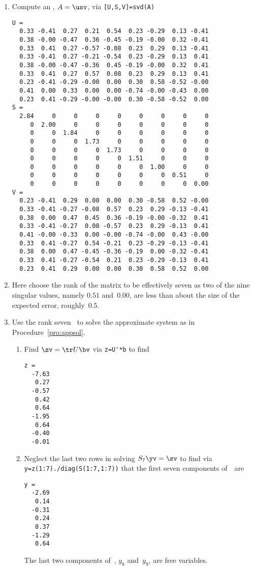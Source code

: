 \begin{example}
\begin{solution}
\begin{enumerate}
\item Compute an \svd, \(A=\usv\), via \verb|[U,S,V]=svd(A)| \twodp
{\small
\begin{verbatim}
U =
  0.33 -0.41  0.27  0.21  0.54  0.23 -0.29  0.13 -0.41
  0.38 -0.00 -0.47  0.36 -0.45 -0.19 -0.00  0.32 -0.41
  0.33  0.41  0.27 -0.57 -0.08  0.23  0.29  0.13 -0.41
  0.33 -0.41  0.27 -0.21 -0.54  0.23 -0.29  0.13  0.41
  0.38 -0.00 -0.47 -0.36  0.45 -0.19 -0.00  0.32  0.41
  0.33  0.41  0.27  0.57  0.08  0.23  0.29  0.13  0.41
  0.23 -0.41 -0.29 -0.00  0.00  0.30  0.58 -0.52 -0.00
  0.41  0.00  0.33  0.00  0.00 -0.74 -0.00 -0.43  0.00
  0.23  0.41 -0.29 -0.00 -0.00  0.30 -0.58 -0.52  0.00
S =
  2.84     0     0     0     0     0     0     0     0
     0  2.00     0     0     0     0     0     0     0
     0     0  1.84     0     0     0     0     0     0
     0     0     0  1.73     0     0     0     0     0
     0     0     0     0  1.73     0     0     0     0
     0     0     0     0     0  1.51     0     0     0
     0     0     0     0     0     0  1.00     0     0
     0     0     0     0     0     0     0  0.51     0
     0     0     0     0     0     0     0     0  0.00
V =
  0.23 -0.41  0.29  0.00  0.00  0.30 -0.58  0.52 -0.00
  0.33 -0.41 -0.27 -0.08  0.57  0.23  0.29 -0.13 -0.41
  0.38  0.00  0.47  0.45  0.36 -0.19 -0.00 -0.32  0.41
  0.33 -0.41 -0.27  0.08 -0.57  0.23  0.29 -0.13  0.41
  0.41 -0.00 -0.33  0.00 -0.00 -0.74 -0.00  0.43 -0.00
  0.33  0.41 -0.27  0.54 -0.21  0.23 -0.29 -0.13 -0.41
  0.38  0.00  0.47 -0.45 -0.36 -0.19  0.00 -0.32 -0.41
  0.33  0.41 -0.27 -0.54  0.21  0.23 -0.29 -0.13  0.41
  0.23  0.41  0.29  0.00  0.00  0.30  0.58  0.52  0.00
\end{verbatim}
}%

\item Here choose the rank of the matrix to be effectively seven as two of the nine singular values, namely \(0.51\) and~\(0.00\), are less than about the size of the expected error, roughly~\(0.5\).

\item Use the rank seven \svd\ to solve the approximate system as in Procedure~\ref{pro:appsol}.
\begin{enumerate}
\item Find \(\zv=\tr U\bv\) via \verb|z=U'*b| to find
\begin{verbatim}
z =
  -7.63
   0.27
  -0.57
   0.42
   0.64
  -1.95
   0.64
  -0.40
  -0.01
\end{verbatim}

\item Neglect the last two rows in solving \(S_7\yv=\zv\) to find via
\verb|y=z(1:7)./diag(S(1:7,1:7))| that the first seven components of~\yv\ are
\begin{verbatim}
y =
  -2.69
   0.14
  -0.31
   0.24
   0.37
  -1.29
   0.64
\end{verbatim}
The last two components of~\yv, \(y_8\) and~\(y_9\), are free variables.


\end{enumerate}
\end{enumerate}
\end{solution}
\end{example}
